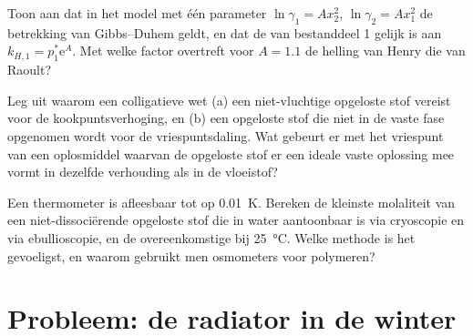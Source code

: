\begin{exercise}[$\star\star\star$]\label{exo:b2:chemical-potential:10}
Toon aan dat in het model met één parameter $\ln\gamma_1 = Ax_2^2$, $\ln\gamma_2 =
Ax_1^2$ de betrekking van Gibbs--Duhem geldt, en dat de  van
bestanddeel 1 gelijk is aan $k_{H,1} = p_1^*\mathrm e^A$. Met welke factor overtreft
voor $A = 1.1$ de helling van Henry die van Raoult?
\end{exercise}

\begin{exercise}[$\star\star\star$]\label{exo:b2:chemical-potential:11}
Leg uit waarom een colligatieve wet (a) een niet-vluchtige opgeloste stof vereist voor de
kookpuntsverhoging, en (b) een opgeloste stof die niet in de vaste fase opgenomen wordt voor
de vriespuntsdaling. Wat gebeurt er met het vriespunt van een
oplosmiddel waarvan de opgeloste stof er een ideale vaste oplossing mee vormt in dezelfde
verhouding als in de vloeistof?
\end{exercise}

\begin{exercise}[$\star\star\star$]\label{exo:b2:chemical-potential:12}
Een thermometer is afleesbaar tot op \qty{0.01}{K}. Bereken de kleinste molaliteit van een
niet-dissociërende opgeloste stof die in water aantoonbaar is via cryoscopie en via
ebullioscopie, en de overeenkomstige  bij \qty{25}{\celsius}.
Welke methode is het gevoeligst, en waarom gebruikt men osmometers voor polymeren?
\end{exercise}

\section{Probleem: de radiator in de winter}

